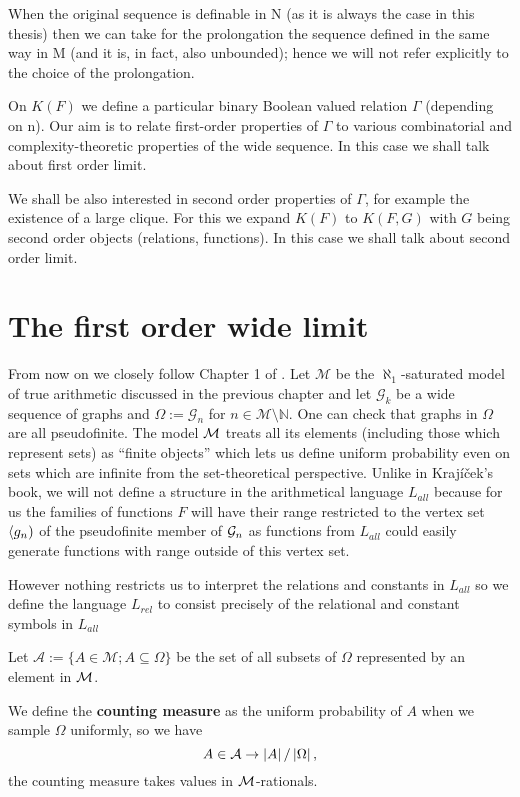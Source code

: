When the original sequence is definable in N (as it is always the case in this
thesis) then we can take for the prolongation the sequence defined
in the same way in M (and it is, in fact, also unbounded); hence
we will not refer explicitly to the choice of the prolongation.

On $K(F)$ we define a particular binary Boolean valued relation
$\Gamma$ (depending on n). Our aim is to relate first-order properties
of $\Gamma$ to various combinatorial and complexity-theoretic
properties of the wide sequence. In this case we shall talk about 
first order limit.

 We shall be also interested in second order properties of $\Gamma$,
for example the existence of a large clique. For this we expand
$K(F)$ to $K(F,G)$ with $G$ being second order objects (relations, functions).
In this case we shall talk about second order limit.

 

\section{The first order wide limit}

From now on we closely follow Chapter 1 of \cite{krajicek2010forcing}. Let $\mathcal{M}$ be the $\aleph_1$-saturated model of true arithmetic discussed in the previous chapter and let $\mathcal{G}_k$ be a wide sequence of graphs and $\Omega:=\mathcal{G}_n$ for $n\in\mathcal{M}\setminus \mathbb{N}$. One can check that graphs in $\Omega$ are all pseudofinite. The model $\mathcal{M}$ treats all its elements (including those which represent sets) as ``finite objects'' which lets us define uniform probability even on sets which are infinite from the set-theoretical perspective. Unlike in Krajíček's book, we will not define a structure in the arithmetical language $L_{all}$ because for us the families of functions $F$ will have their range restricted to the vertex set $\langle g_n)$ of the pseudofinite member of $\mathcal{G}_n$ as functions from $L_{all}$ could easily generate functions with range outside of this vertex set.

However nothing restricts us to interpret the relations and constants in $L_{all}$ so we define the language $L_{rel}$ to consist precisely of the relational and constant symbols in $L_{all}$

\begin{defi}
Let $\mathcal{A}:=\{A\in\mathcal{M};A\subseteq \Omega\}$ be the set of all subsets of $\Omega$ represented by an element in $\mathcal{M}$.

We define the \textbf{counting measure} as the uniform probability of $A$ when we sample $\Omega$ uniformly, so we have
\[A\in\mathcal{A} \to \left|{A}\right|/\left|{\Omega}\right|,\]
the counting measure takes values in $\mathcal{M}$-rationals.
\end{defi}

